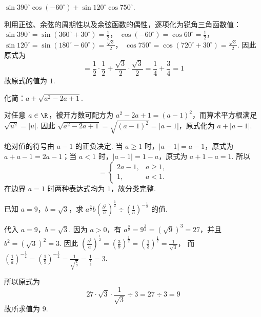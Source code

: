 \begin{problem}
\(\sin 390^\circ\cos\left(-60^\circ\right)+\sin 120^\circ\cos 750^\circ\).
\end{problem}

\begin{solution}
利用正弦、余弦的周期性以及余弦函数的偶性，逐项化为锐角三角函数值：
\(\sin 390^\circ=\sin\left(360^\circ+30^\circ\right)=\frac{1}{2}\)，
\(\cos\left(-60^\circ\right)=\cos 60^\circ=\frac{1}{2}\)，
\(\sin 120^\circ=\sin\left(180^\circ-60^\circ\right)=\frac{\sqrt{3}}{2}\)，
\(\cos 750^\circ=\cos\left(720^\circ+30^\circ\right)=\frac{\sqrt{3}}{2}\). 因此原式为
\[
=\frac{1}{2}\cdot\frac{1}{2}+\frac{\sqrt{3}}{2}\cdot\frac{\sqrt{3}}{2}
=\frac{1}{4}+\frac{3}{4}=1
\]
故原式的值为 \(1\).
\end{solution}

\begin{problem}
化简：\(a+\sqrt{a^2-2a+1}\).
\end{problem}

\begin{solution}
对任意 \(a\in\R\)，被开方数可配方为 \(a^2-2a+1=(a-1)^2\)，而算术平方根满足 \(\sqrt{u^2}=\lvert u\rvert\). 因此 \(\sqrt{a^2-2a+1}=\sqrt{(a-1)^2}=\lvert a-1\rvert\)，原式化为 \(a+\lvert a-1\rvert\).

绝对值的符号由 \(a-1\) 的正负决定. 当 \(a\geq 1\) 时，\(\lvert a-1\rvert=a-1\)，原式为 \(a+a-1=2a-1\)；当 \(a<1\) 时，\(\lvert a-1\rvert=1-a\)，原式为 \(a+1-a=1\). 所以
\[
=\begin{cases}
2a-1,&a\geq 1,\\
1,&a<1.
\end{cases}
\]
在边界 \(a=1\) 时两种表达式均为 \(1\)，故分类完整.
\end{solution}

\begin{problem}
已知 \(a=9\)，\(b=\sqrt{3}\)，求 \(a^{\frac{3}{2}}b\left(\frac{b^2}{a}\right)^{\frac{1}{2}}\div\left(\frac{1}{a}\right)^{-\frac{1}{2}}\) 的值.
\end{problem}

\begin{solution}
代入 \(a=9\)，\(b=\sqrt{3}\). 因为 \(a>0\)，有 \(a^{\frac{3}{2}}=9^{\frac{3}{2}}=\left(\sqrt{9}\right)^3=27\)，并且 \(b^2=\left(\sqrt{3}\right)^2=3\). 因此
\(\left(\frac{b^2}{a}\right)^{\frac{1}{2}}=\left(\frac{3}{9}\right)^{\frac{1}{2}}=\left(\frac{1}{3}\right)^{\frac{1}{2}}=\frac{1}{\sqrt{3}}\)，
而 \(\left(\frac{1}{a}\right)^{-\frac{1}{2}}=\left(\frac{1}{9}\right)^{-\frac{1}{2}}=\frac{1}{\sqrt{\frac{1}{9}}}=\frac{1}{\frac{1}{3}}=3\).

所以原式为
\[
27\cdot\sqrt{3}\cdot\frac{1}{\sqrt{3}}\div 3=27\div 3=9
\]
故所求值为 \(9\).
\end{solution}

